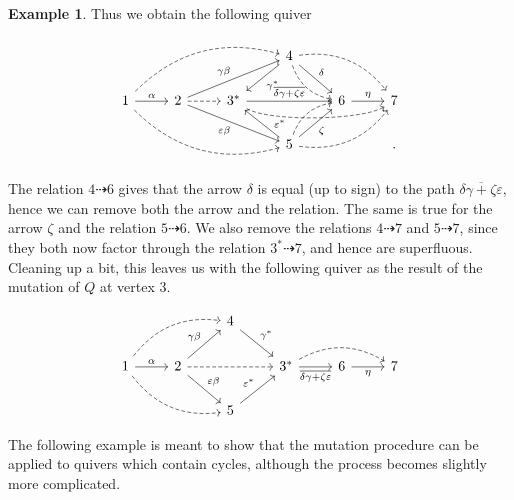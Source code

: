 \documentclass[12pt, dvipsnames, oneside]{amsart}
\theoremstyle{definition}
\newtheorem{example}{Example}[section]
\begin{document}
\begin{example}
Thus we obtain the following quiver

\begin{equation*}
\begin{tikzcd}
 & & & 4 \arrow[dr, "\delta"] \arrow[dl, "{\gamma^*}"] \arrow[dr, bend right, dashed] \arrow[drr, dashed, bend left] & & \\
 1 \arrow[r, "\alpha"] \arrow[urrr, bend left, dashed] \arrow[drrr, bend right, dashed] & 2 \arrow[r, dashed] \arrow[urr, "{\gamma\beta}"] \arrow[drr, "{\varepsilon\beta}"'] & 3^* \arrow[rr, "{\overline{\delta\gamma+\zeta\varepsilon}}"] \arrow[rrr, bend right, looseness=0.5, dashed] & & 6 \arrow[r, "\eta"] & 7 \\
 & & & 5 \arrow[ur, "{\zeta}"'] \arrow[ul, near start, "{\varepsilon^*}"'] \arrow[ur, bend left, dashed] \arrow[urr, dashed, bend right] & & .
\end{tikzcd}
\end{equation*}

The relation $4\dashrightarrow 6$ gives that the arrow $\delta$ is equal (up to sign) to the path $\overline{\delta\gamma+\zeta\varepsilon}$, hence we can remove both the arrow and the relation. The same is true for the arrow $\zeta$ and the relation $5\dashrightarrow 6$. We also remove the relations $4\dashrightarrow 7$ and $5\dashrightarrow 7$, since they both now factor through the relation $3^*\dashrightarrow 7$, and hence are superfluous. Cleaning up a bit, this leaves us with the following quiver as the result of the mutation of $Q$ at vertex $3$.

\begin{equation*}
\begin{tikzcd}
 & & 4 \arrow[dr, "{\gamma^*}"] & & & \\
 1 \arrow[r, "\alpha"] \arrow[urr, bend left, dashed] \arrow[drr, bend right, dashed] & 2 \arrow[ur, "{\gamma\beta}"] \arrow[dr, "{\varepsilon\beta}"] \arrow[rr, dashed] & & 3^* \arrow[r, "{\overline{\delta\gamma+\zeta\varepsilon}}"'] \arrow[rr, bend left, dashed] & 6 \arrow[r, "\eta"'] & 7 \\
 & & 5 \arrow[ur, "{\varepsilon^*}"] & & & 
\end{tikzcd}
\end{equation*}

\end{example}

The following example is meant to show that the mutation procedure can be applied to quivers which contain cycles, although the process becomes slightly more complicated. 
\end{document}
